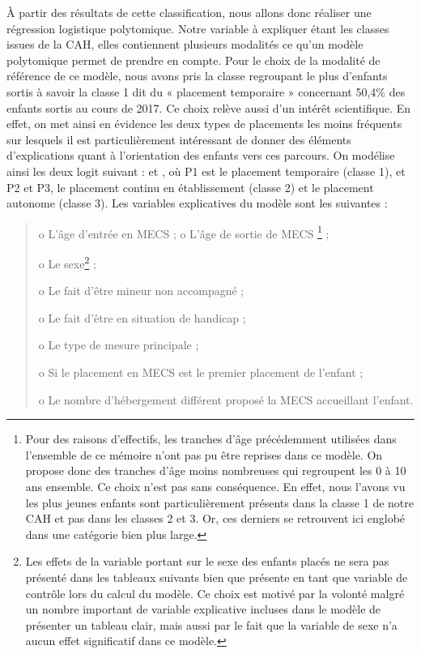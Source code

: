 \documentclass[
  12,
  a4paper,
]{report}
\begin{document}
À partir des résultats de cette classification, nous allons donc
réaliser une régression logistique polytomique. Notre variable à
expliquer étant les classes issues de la CAH, elles contiennent
plusieurs modalités ce qu'un modèle polytomique permet de prendre en
compte. Pour le choix de la modalité de référence de ce modèle, nous
avons pris la classe regroupant le plus d'enfants sortis à savoir la
classe 1 dit du « placement temporaire » concernant 50,4\% des enfants
sortis au cours de 2017. Ce choix relève aussi d'un intérêt
scientifique. En effet, on met ainsi en évidence les deux types de
placements les moins fréquents sur lesquels il est particulièrement
intéressant de donner des éléments d'explications quant à l'orientation
des enfants vers ces parcours. On modélise ainsi les deux logit suivant
: et , où P1 est le placement temporaire (classe 1), et P2 et P3, le
placement continu en établissement (classe 2) et le placement autonome
(classe 3). Les variables explicatives du modèle sont les suivantes :

\begin{quote}
o L'âge d'entrée en MECS ; o L'âge de sortie de MECS
\footnote{Pour des raisons d'effectifs, les tranches d'âge précédemment utilisées dans l'ensemble de ce mémoire n'ont pas pu être reprises dans ce modèle. On propose donc des tranches d'âge moins nombreuses qui regroupent les 0 à 10 ans ensemble. Ce choix n'est pas sans conséquence. En effet, nous l'avons vu les plus jeunes enfants sont particulièrement présents dans la classe 1 de notre CAH et pas dans les classes 2 et 3. Or, ces derniers se retrouvent ici englobé dans une catégorie bien plus large.}
;

o Le
sexe\footnote{Les effets de la variable portant sur le sexe des enfants placés ne sera pas présenté dans les tableaux suivants bien que présente en tant que variable de contrôle lors du calcul du modèle. Ce choix est motivé par la volonté malgré un nombre important de variable explicative incluses dans le modèle de présenter un tableau clair, mais aussi par le fait que la variable de sexe n'a aucun effet significatif dans ce modèle.}
;

o Le fait d'être mineur non accompagné ;

o Le fait d'être en situation de handicap ;

o Le type de mesure principale ;

o Si le placement en MECS est le premier placement de l'enfant ;

o Le nombre d'hébergement différent proposé la MECS accueillant
l'enfant.
\end{quote}
\end{document}
